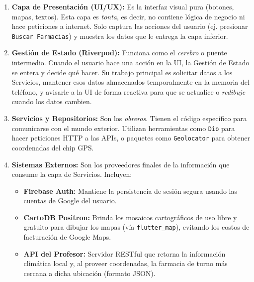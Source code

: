 \documentclass[12pt,a4paper]{article}
\begin{document}
\begin{enumerate}
    \item \textbf{Capa de Presentación (UI/UX):} Es la interfaz visual pura (botones, mapas, textos). Esta capa es \textit{tonta}, es decir, no contiene lógica de negocio ni hace peticiones a internet. Solo captura las acciones del usuario (ej. presionar \texttt{Buscar Farmacias}) y muestra los datos que le entrega la capa inferior.
    
    \item \textbf{Gestión de Estado (Riverpod):} Funciona como el \textit{cerebro} o puente intermedio. Cuando el usuario hace una acción en la UI, la Gestión de Estado se entera y decide qué hacer. Su trabajo principal es solicitar datos a los Servicios, mantener esos datos almacenados temporalmente en la memoria del teléfono, y avisarle a la UI de forma reactiva para que se actualice o \textit{redibuje} cuando los datos cambien.
    
    \item \textbf{Servicios y Repositorios:} Son los \textit{obreros}. Tienen el código específico para comunicarse con el mundo exterior. Utilizan herramientas como \texttt{Dio} para hacer peticiones HTTP a las APIs, o paquetes como \texttt{Geolocator} para obtener coordenadas del chip GPS. 
    
    \item \textbf{Sistemas Externos:} Son los proveedores finales de la información que consume la capa de Servicios. Incluyen:
    \begin{itemize}
        \item \textbf{Firebase Auth:} Mantiene la persistencia de sesión segura usando las cuentas de Google del usuario.
        \item \textbf{CartoDB Positron:} Brinda los mosaicos cartográficos de uso libre y gratuito para dibujar los mapas (vía \texttt{flutter\_map}), evitando los costos de facturación de Google Maps.
        \item \textbf{API del Profesor:} Servidor RESTful que retorna la información climática local y, al proveer coordenadas, la farmacia de turno más cercana a dicha ubicación (formato JSON).
    \end{itemize}
\end{enumerate}
\end{document}
